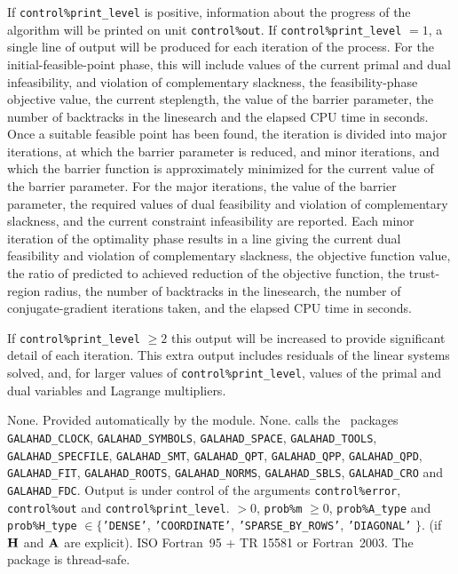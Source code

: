 \documentclass{galahad}
\newcommand{\packagename}{CQP}
\begin{document}
\galinfo
If {\tt control\%print\_level} is positive, information about the progress
of the algorithm will be printed on unit {\tt control\-\%out}.
If {\tt control\%print\_level} $= 1$, a single line of output will be produced
for each iteration of the process.
For the initial-feasible-point phase,
this will include values of the current primal and dual infeasibility, and
violation of complementary slackness, the feasibility-phase objective value,
the current steplength, the value of the barrier parameter, the
number of backtracks in the linesearch and the elapsed CPU time in seconds.
Once a suitable feasible point has been found, the iteration is divided
into major iterations, at which the barrier parameter is reduced, and
minor iterations, and which the barrier function is approximately minimized
for the current value of the barrier parameter. For the major iterations,
the value of the barrier parameter, the required values of
dual feasibility and violation of complementary slackness, and the current
constraint infeasibility are reported. Each minor iteration of the
optimality phase results in a line giving
the current dual feasibility and violation of complementary slackness, the
objective function value, the ratio of predicted to achieved reduction
of the objective function, the trust-region radius, the
number of backtracks in the linesearch, the number of conjugate-gradient
iterations taken, and the elapsed CPU time in seconds.

If {\tt control\%print\_level} $\geq 2$ this
output will be increased to provide significant detail of each iteration.
This extra output includes residuals of the linear systems solved, and,
for larger values of {\tt control\%print\_level}, values of the primal and dual
variables and Lagrange multipliers.


\galgeneral

\galcommon None.
\galworkspace Provided automatically by the module.
\galroutines None.
\galmodules {\tt \packagename\_solve} calls the \galahad\ packages
{\tt GALAHAD\_CLOCK},
{\tt GALAHAD\_SY\-M\-BOLS},
{\tt GALA\-HAD\_SPACE},
{\tt GAL\-AHAD\_TOOLS},
{\tt GALAHAD\_SPECFILE},
{\tt GALAHAD\_SMT},
{\tt GALAHAD\_QPT},
{\tt GALAHAD\_QPP},
{\tt GALAHAD\_QPD},
{\tt GALAHAD\_FIT},
{\tt GALAHAD\_ROOTS},
{\tt GALAHAD\_NORMS},
{\tt GALAHAD\_SBLS},
{\tt GALAHAD\_CRO}
and
{\tt GAL\-AHAD\_FDC}.
\galio Output is under control of the arguments
 {\tt control\%error}, {\tt control\%out} and {\tt control\%print\_level}.
 $> 0$, {\tt prob\%m} $\geq  0$,
{\tt prob\%A\_type} and {\tt prob\%H\_type} $\in \{${\tt 'DENSE'},
 {\tt 'COORDINATE'}, {\tt 'SPARSE\_BY\_\-ROWS'}, {\tt 'DIAGONAL'} $\}$.
(if ${\mathbf{H}}$ and ${\mathbf{A}}$ are explicit).
\galportability ISO Fortran~95 + TR 15581 or Fortran~2003.
The package is thread-safe.
\end{document}
